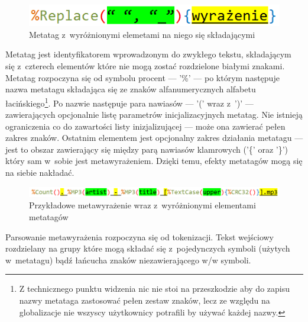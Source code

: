 \begin{figure}
\begin{center}
\includegraphics[scale=0.50]{img/metatag_sample.png}
\end{center}
\caption{Metatag z~wyróżnionymi elemetami na niego się składającymi}
\end{figure}

\par
Metatag jest identyfikatorem wprowadzonym do zwykłego tekstu, składającym się z~czterech elementów które nie mogą zostać rozdzielone białymi znakami. Metatag rozpoczyna się od symbolu procent --- '\%' --- po którym następuje nazwa metatagu składająca się ze znaków alfanumerycznych alfabetu łacińskiego\footnote{Z technicznego punktu widzenia nic nie stoi na przeszkodzie aby do zapisu nazwy metataga zastosować pełen zestaw znaków, lecz ze względu na globalizacje nie wszyscy użytkownicy potrafili by używać każdej nazwy.}.
Po nazwie następuje para nawiasów --- '(' wraz z~')' --- zawierających opcjonalnie listę parametrów inicjalizacyjnych metatag. Nie istnieją ograniczenia co do zawartości listy inizjalizującej --- może ona zawierać pełen zakres znaków.
Ostatnim elementem jest opcjonalny zakres działania metatagu --- jest to obszar zawierający się między parą nawiasów klamrowych ('\{' oraz '\}') który sam w~sobie jest metawyrażeniem. Dzięki temu, efekty metatagów mogą się na siebie nakładać.

\begin{figure}[h]
\begin{center}
\includegraphics[scale=0.55]{img/metatag_expr2.png}
\end{center}
\caption{Przykładowe metawyrażenie wraz z~wyróżnionymi elementami metatagów}
\label{metatag-expr}
\end{figure}

\par
Parsowanie metawyrażenia rozpoczyna się od tokenizacji. Tekst wejściowy rozdzielany na grupy które mogą składać się z~pojedynczych symboli (użytych w~metatagu) bądź łańcucha znaków niezawierającego w/w symboli.

